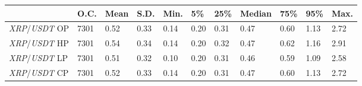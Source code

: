 \begin{tabular}{lllllllllll}
\toprule
 & \textbf{O.C.} & \textbf{Mean} & \textbf{S.D.} & \textbf{Min.} & \textbf{5\%} & \textbf{25\%} & \textbf{Median} & \textbf{75\%} & \textbf{95\%} & \textbf{Max.} \\
\midrule
\emph{XRP}/\emph{USDT} OP & 7301 & 0.52 & 0.33 & 0.14 & 0.20 & 0.31 & 0.47 & 0.60 & 1.13 & 2.72 \\
\emph{XRP}/\emph{USDT} HP & 7301 & 0.54 & 0.34 & 0.14 & 0.20 & 0.32 & 0.47 & 0.62 & 1.16 & 2.91 \\
\emph{XRP}/\emph{USDT} LP & 7301 & 0.51 & 0.32 & 0.10 & 0.20 & 0.31 & 0.46 & 0.59 & 1.09 & 2.58 \\
\emph{XRP}/\emph{USDT} CP & 7301 & 0.52 & 0.33 & 0.14 & 0.20 & 0.31 & 0.47 & 0.60 & 1.13 & 2.72 \\
\bottomrule
\end{tabular}
